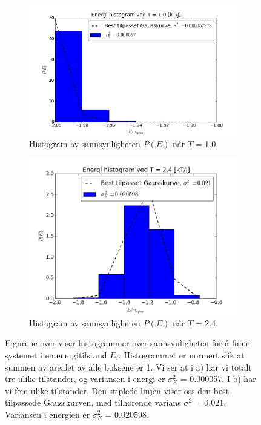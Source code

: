 \documentclass[11pt,a4paper]{article}
\begin{document}
\FloatBarrier
\begin{figure}[!ht]
\centering
\begin{subfigure}{.55\textwidth}
  \centering
  \includegraphics[width=1.1\linewidth]{4e_BRUK1.png}
  \caption{Histogram av sannsynligheten $P(E)$ når $T$ = 1.0.}
  \label{hist1}
\end{subfigure}%
\begin{subfigure}{.55\textwidth}
  \centering
  \includegraphics[width=1.1\linewidth]{4e_BRUK.png}
  \caption{ Histogram av sannsynligheten $P(E)$ når $T$ = 2.4. }
  \label{hist2}
\end{subfigure}
\caption{Figurene over viser histogrammer over sannsynligheten for å finne systemet i en energitilstand $E_i$. Histogrammet er normert slik at summen av arealet av alle boksene er 1. Vi ser at i a) har vi totalt tre ulike tilstander, og variansen i energi er $\sigma_E^2$ = 0.000057. I b) har vi fem ulike tilstander. Den stiplede linjen viser oss den best tilpassede Gausskurven, med tilhørende varians $\sigma^2$ = 0.021.  Variansen i energien er $\sigma_E^2$ = 0.020598.}
\label{fig:P(E)}
\end{figure}
\FloatBarrier
\end{document}

